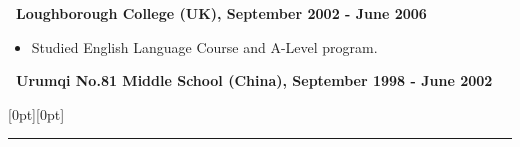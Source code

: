 \documentclass[a4paper,12pt]{letter}
\begin{document}
\textbf{\normalsize ~Loughborough College (UK), September 2002 - June 2006}
\begin{itemize}
\item \textrm{\normalsize Studied English Language Course and A-Level program.}
\end{itemize}

\textbf{\normalsize ~Urumqi No.81 Middle School (China), September 1998 - June 2002} 



\raisebox{0pt}[0pt][0pt]{\Large\textbf{\raisebox{-3.5ex}{Computing Skill}}}

\rule[-0.5cm]{10cm}{1pt}

% 
\end{document}

